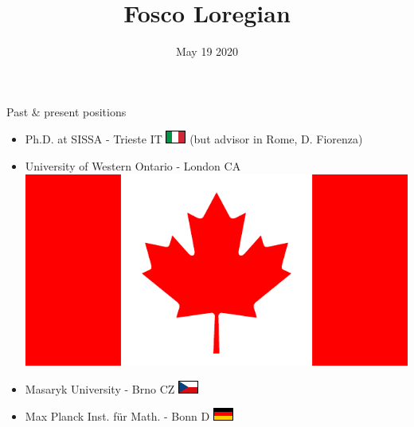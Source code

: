 \documentclass[handout]{beamer}
\title{Fosco Loregian \darkLogo}
\author{}
\date{May 19 2020}
\begin{document}
\begin{frame}
  \maketitle
\end{frame}
\begin{frame}{Past \& present positions}
  \begin{itemize}
    \item<+-> Ph.D. at SISSA - Trieste IT \includegraphics{ita.pdf} (but advisor in Rome, {\color{magenta} D. Fiorenza})

    \item<+-> University of Western Ontario - London CA \includegraphics[scale=.04]{can.pdf}

    \item<+-> Masaryk University - Brno CZ \includegraphics{czr.pdf}

    \item<+-> Max Planck Inst. für Math. - Bonn D \includegraphics{ger.pdf}


\end{itemize}
\end{frame}
\end{document}
